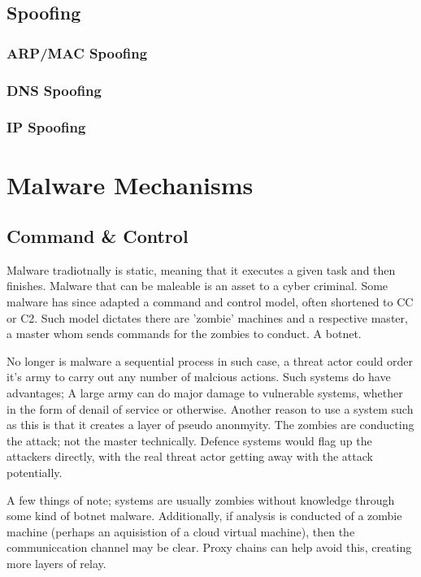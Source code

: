 \section{Spoofing}
\subsection{ARP/MAC Spoofing}
\subsection{DNS Spoofing}
\subsection{IP Spoofing}



\chapter{Malware Mechanisms}

\section{Command \& Control}
Malware tradiotnally is static, meaning that it executes a given task and then finishes. Malware that can be maleable is an asset to a cyber criminal. 
Some malware has since adapted a command and control model, often shortened to CC or C2. Such model dictates there are 'zombie' machines and a respective master, a master whom sends commands for the zombies to conduct. A botnet.

No longer is malware a sequential process in such case, a threat actor could order it's army to carry out any number of malcious actions. Such systems do have advantages; A large army can do major damage to vulnerable systems, whether in the form of denail of service or otherwise.
Another reason to use a system such as this is that it creates a layer of pseudo anonmyity. The zombies are conducting the attack; not the master technically. Defence systems would flag up the attackers directly, with the real threat actor getting away with the attack potentially.

A few things of note; systems are usually zombies without knowledge through some kind of botnet malware. Additionally, if analysis is conducted of a zombie machine (perhaps an aquisistion of a cloud virtual machine), then the communiccation channel may be clear. Proxy chains can help avoid this, creating more layers of relay.

